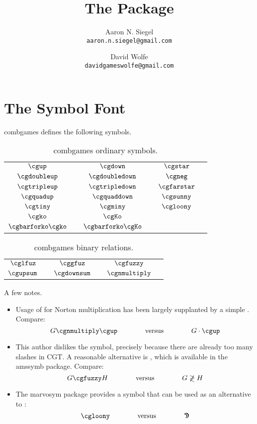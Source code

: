 \documentclass{article}
\title{The \combgames{} Package}
\author{Aaron N. Siegel\\\texttt{aaron.n.siegel@gmail.com} \and
        David Wolfe\\\texttt{davidgameswolfe@gmail.com}}
\newcommand\cn[1]{\texttt{\string#1}}
\newcommand\ds[1]{$#1$ & \cn{#1}}
\newcommand\combgames{\textsf{combgames}}
\begin{document}
\maketitle

\tableofcontents

\section{The Symbol Font}

\combgames{} defines the following symbols.

\begin{table}[H]
\centering
\begin{tabular}{clclcl}
\ds{\cgup} & \ds{\cgdown} & \ds{\cgstar} \bigstrut\\
\ds{\cgdoubleup} & \ds{\cgdoubledown} & \ds{\cgneg} \bigstrut\\
\ds{\cgtripleup} & \ds{\cgtripledown} & \ds{\cgfarstar} \bigstrut\\
\ds{\cgquadup} & \ds{\cgquaddown} & \ds{\cgsunny} \bigstrut\\
\ds{\cgtiny} & \ds{\cgminy} & \ds{\cgloony} \bigstrut\\
\ds{\cgko} & \ds{\cgKo} \bigstrut\\
\ds{\cgkobar} & \ds{\cgKobar} \bigstrut
\end{tabular}
\caption{\combgames{} ordinary symbols.}
\end{table}



\begin{table}[H]
\centering
\begin{tabular}{clclcl}
\ds{\cglfuz} & \ds{\cggfuz} & \ds{\cgfuzzy} \bigstrut\\
\ds{\cgupsum} & \ds{\cgdownsum} & \ds{\cgnmultiply} \bigstrut
\end{tabular}
\caption{\combgames{} binary relations.}
\end{table}

A few notes.

\begin{itemize}
\item Usage of \cn{\cgnmultiply} for Norton multiplication has been largely supplanted by a simple \cn{\cdot}.  Compare:
\[G \cgnmultiply \cgup \qquad\qquad \textrm{versus} \qquad\qquad G \cdot \cgup\]
\item This author dislikes the \cn{\cgfuzzy} symbol, precisely because there are already too many slashes in CGT.  A reasonable alternative is \cn{\not}\cn{\gtrless}, which is available in the \textsf{amssymb} package.  Compare:
\[G \cgfuzzy H \qquad\qquad \textrm{versus} \qquad\qquad G \not\gtrless H\]
\item The \textsf{marvosym} package provides a \cn{\Moon} symbol that can be used as an alternative to \cn{\cgloony}:
\[\cgloony \qquad\qquad \textrm{versus} \qquad\qquad \textrm{\Moon}\]
\end{itemize}
\end{document}
